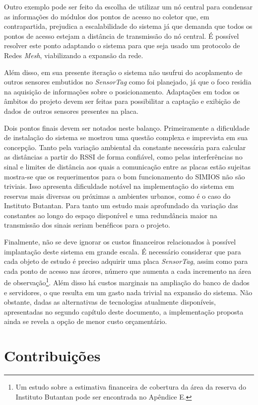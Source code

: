 Outro exemplo pode ser feito da escolha de utilizar um nó central para condensar as informações do módulos dos pontos de acesso no coletor que, em contrapartida, prejudica a escalabilidade do sistema já que demanda que todos os pontos de acesso estejam a distância de transmissão do nó central. É possível resolver este ponto adaptando o sistema para que seja usado um protocolo de Redes \emph{Mesh}, viabilizando a expansão da rede.

Além disso, em sua presente iteração o sistema não usufrui do acoplamento de outros sensores embutidos no \emph{SensorTag} como foi planejado, já que o foco residia na aquisição de informações sobre o posicionamento. Adaptações em todos os âmbitos do projeto devem ser feitas para possibilitar a captação e exibição de dados de outros sensores presentes na placa.

Dois pontos finais devem ser notados neste balanço. Primeiramente a dificuldade de instalação do sistema se mostrou uma questão complexa e imprevista em sua concepção. Tanto pela variação ambiental da constante necessária para calcular as distâncias a partir do RSSI de forma confiável, como pelas interferências no sinal e limites de distância aos quais a comunicação entre as placas estão sujeitas mostra-se que os requerimentos para o bom funcionamento do SIMIOS não são triviais. Isso apresenta dificuldade notável na implementação do sistema em reservas mais diversas ou próximas a ambientes urbanos, como é o caso do Instituto Butantan. Para tanto um estudo mais aprofundado da variação das constantes ao longo do espaço disponível e uma redundância maior na transmissão dos sinais seriam benéficos para o projeto.

Finalmente, não se deve ignorar os custos financeiros relacionados à possível implantação deste sistema em grande escala. É necessário considerar que para cada objeto de estudo é preciso adquirir uma placa \emph{SensorTag}, assim como para cada ponto de acesso nas árores, número que aumenta a cada incremento na área de observação\footnote{Um estudo sobre a estimativa financeira de cobertura da área da reserva do Instituto Butantan pode ser encontrada no Apêndice E.}. Além disso há custos marginais na ampliação do banco de dados e servidores, o que resulta em um gasto nada trivial na expansão do sistema. Não obstante, dadas as alternativas de tecnologias atualmente disponíveis, apresentadas no segundo capítulo deste documento, a implementação proposta ainda se revela a opção de menor custo orçamentário.

\section{Contribuições}

